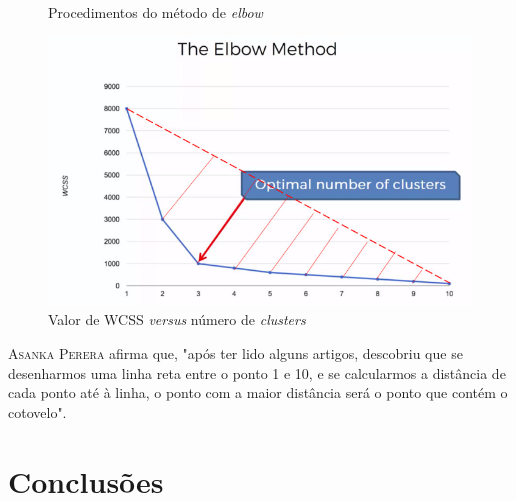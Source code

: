 \documentclass[12pt, a4paper, oneside]{scrreport}
\begin{document}
\begin{figure}[h]
  \begin{center}
  \end{center}
  \caption{\normalfont Procedimentos do método de \textit{elbow}}
  \end{figure}


\begin{figure}[h!]
    \centering
    \includegraphics[scale=0.6]{3.png}
    \caption{Valor de WCSS \textit{versus} número de \textit{clusters}}   
    \label{wrapfig:wcss_k}
\end{figure}

\textsc{Asanka Perera}\cite{asanka} afirma que, "após ter lido alguns artigos, descobriu que se desenharmos uma
linha reta entre o ponto 1 e 10, e se calcularmos a distância de cada ponto até à linha, o ponto com
a maior distância será o ponto que contém o cotovelo".



\chapter{Conclusões}
\end{document}
